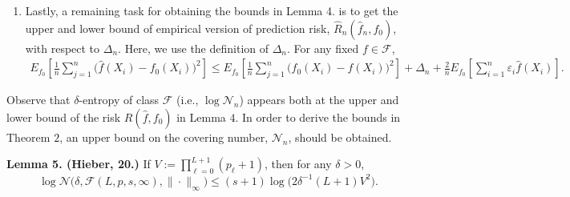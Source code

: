 \documentclass{article}
\theoremstyle{definition}
\begin{document}
\begin{enumerate}
    \item Lastly, a remaining task for obtaining the bounds in Lemma 4. is to get the upper and lower bound of empirical version of prediction risk, $\widehat{R}_{n}(\widehat{f}_{n},f_{0})$, with respect to $\Delta_{n}$. Here, we use the definition of $\Delta_{n}$.
    For any fixed $f\in\mathcal{F}$,
    \begin{eqnarray*}
        E_{f_{0}}\left[ \frac{1}{n} \sum_{j=1}^{n} \big( \widehat{f}(X_{i}) - f_{0}(X_{i}) \big)^{2} \right] 
        \leq E_{f_{0}}\left[ \frac{1}{n} \sum_{j=1}^{n} \bigg( f_{0}(X_{i}) - f(X_{i}) \bigg)^{2} \right] + \Delta_{n} + \frac{2}{n} E_{f_{0}}\left[\sum_{i=1}^{n}\varepsilon_{i} \widehat{f}(X_{i})\right].
    \end{eqnarray*}
\end{enumerate}

Observe that $\delta$-entropy of class $\mathcal{F}$ (i.e., $\log\mathcal{N}_{n}$) appears both at the upper and lower bound of the risk $R(\widehat{f},f_{0})$ in Lemma $4$.
In order to derive the bounds in Theorem $2$, an upper bound on the covering number, $\mathcal{N}_{n}$, should be obtained. \\

\begin{tcolorbox}
\textbf{Lemma 5. (Hieber, 20.)}
If $V:=\prod_{\ell=0}^{L+1}(p_{\ell}+1)$, then for any $\delta>0$,
\begin{equation*}
    \log\mathcal{N}\bigg(\delta,\mathcal{F}(L,p,s,\infty),\|\cdot\|_{\infty}\bigg)
    \leq (s+1)\log\bigg(2\delta^{-1}(L+1)V^{2}\bigg).
\end{equation*}
\end{tcolorbox}
\end{document}
